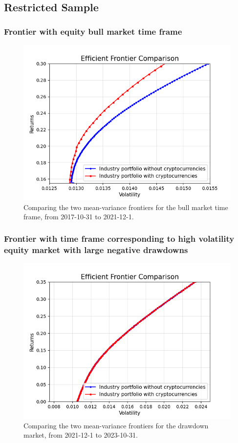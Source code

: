 \documentclass[12pt,a4paper]{article}
\begin{document}
\subsection{Restricted Sample}\label{sec:restricted sample}
\subsubsection{Frontier with equity bull market time frame}
\begin{figure}[H]
    \centering
    \includegraphics[width=0.7\linewidth]{Figures/Efficient_Frontier_Comparison_Bull_Market.png}
    \caption{Comparing the two mean-variance frontiers for the bull market time frame, from 2017-10-31 to 2021-12-1.}
    \label{fig:bull}
\end{figure}

\subsubsection{Frontier with time frame corresponding to high volatility equity market with large negative drawdowns}
\begin{figure}[H]
    \centering
    \includegraphics[width=0.7\linewidth]{Figures/Efficient_Frontier_Comparison_Drawdown_Market.png}
    \caption{Comparing the two mean-variance frontiers for the drawdown market, from 2021-12-1 to 2023-10-31.}
    \label{fig:drawdown}
\end{figure}
\end{document}
